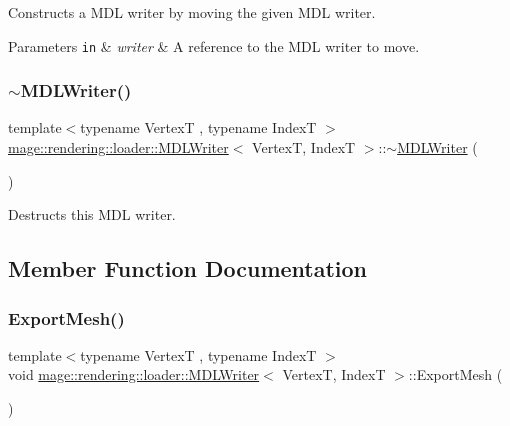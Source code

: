 Constructs a M\+DL writer by moving the given M\+DL writer.


\begin{DoxyParams}[1]{Parameters}
\mbox{\tt in}  & {\em writer} & A reference to the M\+DL writer to move. \\
\hline
\end{DoxyParams}
\hypertarget{classmage_1_1rendering_1_1loader_1_1_m_d_l_writer_aaa0fb8c60dee5352ed467bfb3f283f43}{}\label{classmage_1_1rendering_1_1loader_1_1_m_d_l_writer_aaa0fb8c60dee5352ed467bfb3f283f43} 
\subsubsection{\texorpdfstring{$\sim$\+M\+D\+L\+Writer()}{~MDLWriter()}}
{\footnotesize\ttfamily template$<$typename VertexT , typename IndexT $>$ \\
\hyperlink{classmage_1_1rendering_1_1loader_1_1_m_d_l_writer}{mage\+::rendering\+::loader\+::\+M\+D\+L\+Writer}$<$ VertexT, IndexT $>$\+::$\sim$\hyperlink{classmage_1_1rendering_1_1loader_1_1_m_d_l_writer}{M\+D\+L\+Writer} (\begin{DoxyParamCaption}{ }\end{DoxyParamCaption})}

Destructs this M\+DL writer. 

\subsection{Member Function Documentation}
\hypertarget{classmage_1_1rendering_1_1loader_1_1_m_d_l_writer_a77189702168fc4ea6b9482a9efec788f}{}\label{classmage_1_1rendering_1_1loader_1_1_m_d_l_writer_a77189702168fc4ea6b9482a9efec788f} 
\subsubsection{\texorpdfstring{Export\+Mesh()}{ExportMesh()}}
{\footnotesize\ttfamily template$<$typename VertexT , typename IndexT $>$ \\
void \hyperlink{classmage_1_1rendering_1_1loader_1_1_m_d_l_writer}{mage\+::rendering\+::loader\+::\+M\+D\+L\+Writer}$<$ VertexT, IndexT $>$\+::Export\+Mesh (\begin{DoxyParamCaption}{ }\end{DoxyParamCaption})\hspace{0.3cm}{\ttfamily [private]}}

